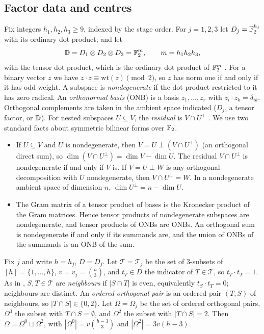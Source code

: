 \subsection{Factor data and centres}\label{col:sec:data}

Fix integers $h_1,h_2,h_3\ge 9$, indexed by the stage order. For $j=1,2,3$ let $D_j=\mathbb{F}_2^{h_j}$ with its
ordinary dot product, and let
\[
  \mathbb{D}=D_1\otimes D_2\otimes D_3=\mathbb{F}_2^{m},\qquad m=h_1h_2h_3,
\]
with the tensor dot product, which is the ordinary dot product of $\mathbb{F}_2^m$ \cite[\S2.3]{oai}. For a
binary vector $z$ we have $z\cdot z\equiv\mathrm{wt}(z)\pmod 2$, so $z$ has norm one if and only if it
has odd weight. A subspace is \emph{nondegenerate} if the dot product restricted to it has zero
radical. An \emph{orthonormal basis} (ONB) is a basis $z_1,\dots,z_r$ with $z_i\cdot z_k=\delta_{ik}$.
Orthogonal complements are taken in the ambient space indicated ($D_j$, a tensor factor, or $\mathbb{D}$).
For nested subspaces $U\subseteq V$, the \emph{residual} is $V\cap U^\perp$ \cite[Lemma~2.2]{oai}. We
use two standard facts about symmetric bilinear forms over $\mathbb{F}_2$.
\begin{itemize}
\item[(F1)] If $U\subseteq V$ and $U$ is nondegenerate, then $V=U\perp(V\cap U^\perp)$ (an orthogonal direct
  sum), so $\dim(V\cap U^\perp)=\dim V-\dim U$. The residual $V\cap U^\perp$ is nondegenerate if and only if
  $V$ is. If $V=U\perp W$ is any orthogonal decomposition with $U$ nondegenerate, then $V\cap U^\perp=W$.
  In a nondegenerate ambient space of dimension $n$, $\dim U^\perp=n-\dim U$.
\item[(F2)] The Gram matrix of a tensor product of bases is the Kronecker product of the Gram
  matrices. Hence tensor products of nondegenerate subspaces are nondegenerate, and tensor products
  of ONBs are ONBs. An orthogonal sum is nondegenerate if and only if its summands are, and the union
  of ONBs of the summands is an ONB of the sum.
\end{itemize}

\begin{definition}\label{col:def:factor}
Fix $j$ and write $h=h_j$, $D=D_j$. Let $\mathcal T=\mathcal T_j$ be the set of $3$-subsets of
$[h]=\{1,\dots,h\}$, $v=v_j=\binom h3$, and $t_T\in D$ the indicator of $T\in\mathcal T$, so
$t_T\cdot t_T=1$. As in \cite[\S2.1]{oai}, $S,T\in\mathcal T$ are \emph{neighbours} if $|S\cap T|$ is
even, equivalently $t_S\cdot t_T=0$; neighbours are distinct. An \emph{ordered orthogonal pair} is an
ordered pair $(T,S)$ of neighbours, so $|T\cap S|\in\{0,2\}$. Let $\Omega=\Omega_j$ be the set of
ordered orthogonal pairs, $\Omega^0$ the subset with $T\cap S=\emptyset$, and $\Omega^2$ the subset with
$|T\cap S|=2$. Then $\Omega=\Omega^0\sqcup\Omega^2$, with
$|\Omega^0|=v\binom{h-3}{3}$ and $|\Omega^2|=3v(h-3)$.
\end{definition}

